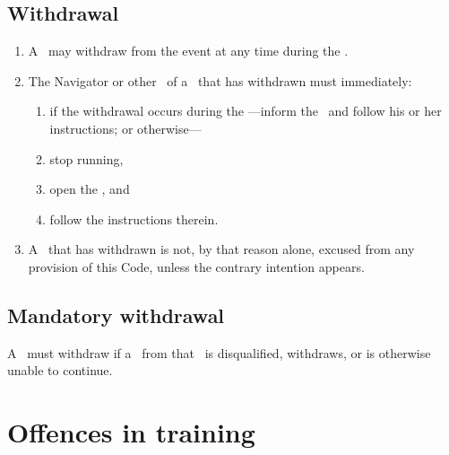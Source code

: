 \documentclass[12pt]{report}
\begin{document}
  \section{Withdrawal}
  \begin{enumerate}
    \item A \team\ may withdraw from the event at any time during the \race.
    \item The Navigator or other \competitor\ of a \team\ that has withdrawn must immediately:
    \begin{enumerate}
    \item if the withdrawal occurs during the \scoutingperiod---inform the \LeadDriver\ and follow his or her instructions;  or otherwise---
        \item stop running,
      \item open the \TeamEnvelope, and
      \item follow the instructions therein.
    \end{enumerate}
    \item A \team\ that has withdrawn is not, by that reason alone, excused from any provision of this Code, unless the contrary intention appears.
  \end{enumerate}
  \section{Mandatory withdrawal}
  \begin{fenumerate}
    \item A \team\ must withdraw if a \competitor\ from that \team\ is disqualified, withdraws, or is otherwise unable to continue.
\end{fenumerate}
\chapter{Offences in training}
\end{document}
